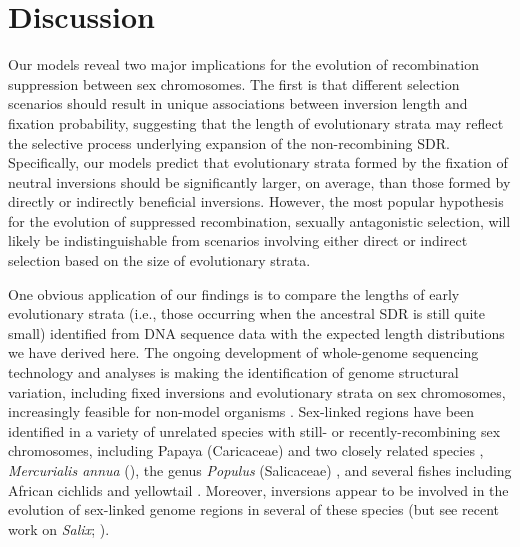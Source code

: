 \documentclass{article}
\begin{document}
\section*{Discussion} \label{sec:Discussion}

Our models reveal two major implications for the evolution of recombination suppression between sex chromosomes. The first is that different selection scenarios should result in unique associations between inversion length and fixation probability, suggesting that the length of evolutionary strata may reflect the selective process underlying expansion of the non-recombining SDR. Specifically, our models predict that evolutionary strata formed by the fixation of neutral inversions should be significantly larger, on average, than those formed by directly or indirectly beneficial inversions. However, the most popular hypothesis for the evolution of suppressed recombination, sexually antagonistic selection, will likely be indistinguishable from scenarios involving either direct or indirect selection based on the size of evolutionary strata.

One obvious application of our findings is to compare the lengths of early evolutionary strata (i.e., those occurring when the ancestral SDR is still quite small) identified from DNA sequence data with the expected length distributions we have derived here. The ongoing development of whole-genome sequencing technology and analyses is making the identification of genome structural variation, including fixed inversions and evolutionary strata on sex chromosomes, increasingly feasible for non-model organisms \citep[reviewed in ][]{Muyle2017, Charlesworth2018,PandayAzad2016}. Sex-linked regions have been identified in a variety of unrelated species with still- or recently-recombining sex chromosomes, including Papaya (Caricaceae) and two closely related species \citep{Wang2012, Lovene2015}, {\itshape Mercurialis annua} (\citealt{VeltsosPannell2019}), the genus {\itshape Populus}  (Salicaceae) \citep[reviewed in][]{HobzaEtAl2018}, and several fishes including African cichlids \citep{GammerdingerKocher2018} and yellowtail \citep{KoyamaEtAl2015}. Moreover, inversions appear to be involved in the evolution of sex-linked genome regions in several of these species (but see recent work on {\itshape Salix}; \citealt{AlmeidaMank2019}). 
\end{document}
